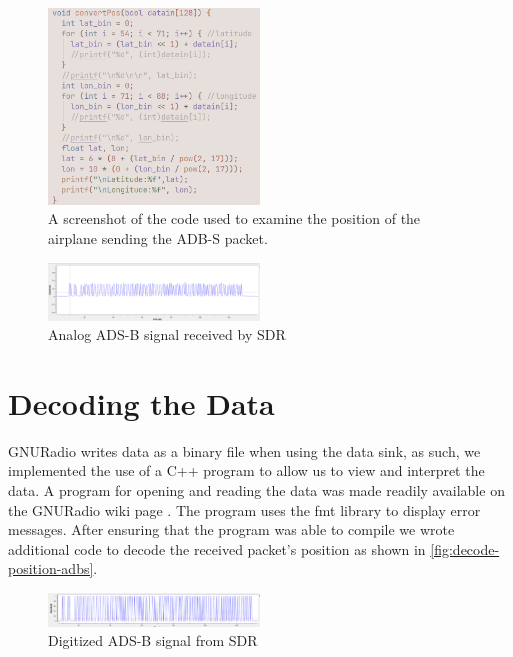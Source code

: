 \documentclass[conference, onecolumn]{IEEEtran}
\begin{document}
\begin{figure}
  \begin{center}
    \includegraphics[width=0.5\textwidth]{./figures/fig_decode_position.png}
  \end{center}
  \caption{A screenshot of the code used to examine the position of the airplane sending the ADB-S packet.}\label{fig:decode-position-adbs}
\end{figure}

\begin{figure}
  \begin{center}
    \includegraphics[width=0.5\textwidth]{./figures/fig_ADSB_recv_analog.png}
  \end{center}
  \caption{Analog ADS-B signal received by SDR}\label{fig:analog_rec}
\end{figure}

\section{Decoding the Data}
GNURadio writes data as a binary file when using the data sink, as such, we implemented the use of a C++ program to allow us to view and interpret the data. A program for opening and reading the data was made readily available on the GNURadio wiki page \cite{gnuradio-reading-file-cpp}. The program uses the fmt library\cite{fmt-library} to display error messages. After ensuring that the program was able to compile we wrote additional code to decode the received packet's position as shown in \autoref{fig:decode-position-adbs}.

\begin{figure}
  \begin{center}
    \includegraphics[width=0.5\textwidth]{./figures/fig_ADSB_recv_digital.png}
  \end{center}
  \caption{Digitized ADS-B signal from SDR}\label{fig:digital}
\end{figure}
\end{document}
